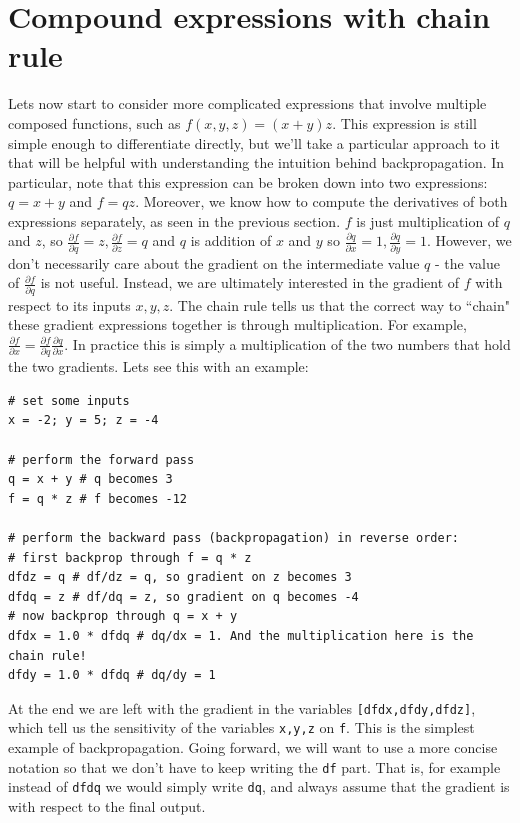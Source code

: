 \section*{Compound expressions with chain rule}

Lets now start to consider more complicated expressions that involve multiple composed functions, such as $f(x,y,z) = (x + y) z$. This expression is still simple enough to differentiate directly, but we’ll take a particular approach to it that will be helpful with understanding the intuition behind backpropagation. In particular, note that this expression can be broken down into two expressions: $q=x+y$ and $f=qz$. Moreover, we know how to compute the derivatives of both expressions separately, as seen in the previous section. $f$ is just multiplication of $q$ and $z$, so $\frac{\partial f}{\partial q} = z, \frac{\partial f}{\partial z} = q$ and $q$ is addition of $x$ and $y$ so $\frac{\partial q}{\partial x} = 1, \frac{\partial q}{\partial y} = 1$. However, we don’t necessarily care about the gradient on the intermediate value $q$ - the value of $\frac{\partial f}{\partial q}$ is not useful. Instead, we are ultimately interested in the gradient of $f$ with respect to its inputs $x,y,z$. The chain rule tells us that the correct way to ``chain" these gradient expressions together is through multiplication. For example, $\frac{\partial f}{\partial x} = \frac{\partial f}{\partial q} \frac{\partial q}{\partial x}$. In practice this is simply a multiplication of the two numbers that hold the two gradients. Lets see this with an example:

\begin{lstlisting}[frame=single]
# set some inputs
x = -2; y = 5; z = -4

# perform the forward pass
q = x + y # q becomes 3
f = q * z # f becomes -12

# perform the backward pass (backpropagation) in reverse order:
# first backprop through f = q * z
dfdz = q # df/dz = q, so gradient on z becomes 3
dfdq = z # df/dq = z, so gradient on q becomes -4
# now backprop through q = x + y
dfdx = 1.0 * dfdq # dq/dx = 1. And the multiplication here is the chain rule!
dfdy = 1.0 * dfdq # dq/dy = 1
\end{lstlisting}

At the end we are left with the gradient in the variables \texttt{[dfdx,dfdy,dfdz]}, which tell us the sensitivity of the variables \texttt{x,y,z} on \texttt{f}. This is the simplest example of backpropagation. Going forward, we will want to use a more concise notation so that we don’t have to keep writing the \texttt{df} part. That is, for example instead of \texttt{dfdq} we would simply write \texttt{dq}, and always assume that the gradient is with respect to the final output.

